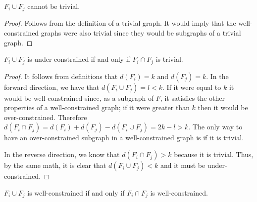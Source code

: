 \documentclass[11pt]{article}
\begin{document}
\begin{lemma}\label{t-l1}
$F_i\cup F_j$ cannot be trivial.
\end{lemma}

\begin{proof}

Follows from the definition of a trivial graph. It would imply that the well-constrained graphs were also trivial since they would be subgraphs of a trivial graph.
\end{proof}


\begin{lemma}\label{uc-l1}
$F_i\cup F_j$ is under-constrained if and only if $F_i\cap F_j$ is trivial.
\end{lemma}

\begin{proof}
It follows from definitions that $d(F_i)=k$ and $d(F_j)=k$. In the forward direction, we have that $d(F_i\cup F_j)=l<k$. If it were equal to $k$ it would be well-constrained since, as a subgraph of $F$, it satisfies the other properties of a well-constrained graph; if it were greater than $k$ then it would be over-constrained. Therefore $d(F_i\cap F_j)=d(F_i)+d(F_j)-d(F_i\cup F_j)=2k-l>k$. The only way to have an over-constrained subgraph in a well-constrained graph is if it is trivial.

In the reverse direction, we know that $d(F_i\cap F_j)>k$ because it is trivial. Thus, by the same math, it is clear that $d(F_i\cup F_j)<k$ and it must be under-constrained.
\end{proof}


\begin{lemma}\label{wc-l1}
$F_i\cup F_j$ is well-constrained if and only if $F_i\cap F_j$ is well-constrained.
\end{lemma}
\end{document}
